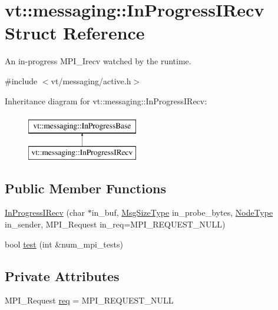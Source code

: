 \hypertarget{structvt_1_1messaging_1_1_in_progress_i_recv}{}\section{vt\+:\+:messaging\+:\+:In\+Progress\+I\+Recv Struct Reference}
\label{structvt_1_1messaging_1_1_in_progress_i_recv}


An in-\/progress M\+P\+I\+\_\+\+Irecv watched by the runtime.  




{\ttfamily \#include $<$vt/messaging/active.\+h$>$}

Inheritance diagram for vt\+:\+:messaging\+:\+:In\+Progress\+I\+Recv\+:\begin{figure}[H]
\begin{center}
\leavevmode
\includegraphics[height=2.000000cm]{structvt_1_1messaging_1_1_in_progress_i_recv}
\end{center}
\end{figure}
\subsection*{Public Member Functions}
\begin{DoxyCompactItemize}
\item 
\hyperlink{structvt_1_1messaging_1_1_in_progress_i_recv_ad581d8dc4f7eb82bf0f7194b6db0fed6}{In\+Progress\+I\+Recv} (char $\ast$in\+\_\+buf, \hyperlink{namespacevt_a408e86a8c7c89309b52907dc5a513924}{Msg\+Size\+Type} in\+\_\+probe\+\_\+bytes, \hyperlink{namespacevt_a866da9d0efc19c0a1ce79e9e492f47e2}{Node\+Type} in\+\_\+sender, M\+P\+I\+\_\+\+Request in\+\_\+req=M\+P\+I\+\_\+\+R\+E\+Q\+U\+E\+S\+T\+\_\+\+N\+U\+LL)
\item 
bool \hyperlink{structvt_1_1messaging_1_1_in_progress_i_recv_ac5cabd7a87cc7c75d6870a2597c50a8c}{test} (int \&num\+\_\+mpi\+\_\+tests)
\end{DoxyCompactItemize}
\subsection*{Private Attributes}
\begin{DoxyCompactItemize}
\item 
M\+P\+I\+\_\+\+Request \hyperlink{structvt_1_1messaging_1_1_in_progress_i_recv_af1ee8d3168a064aa7749b986439b81e8}{req} = M\+P\+I\+\_\+\+R\+E\+Q\+U\+E\+S\+T\+\_\+\+N\+U\+LL
\end{DoxyCompactItemize}
